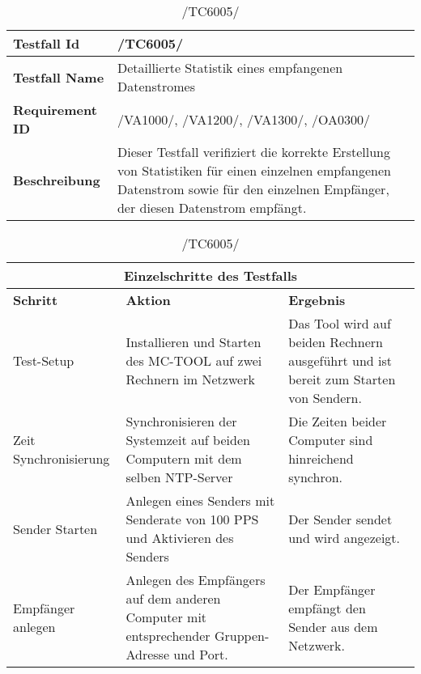     \begin{table}[h]
        \caption{/TC6005/}
        \label{tab:TC6005}
        \begin{center}
            \begin{tabular}{|p{3.5cm}|p{12cm}|}
                \hline
                    \textbf{Testfall Id} & /TC6005/\\
                \hline
                    \textbf{Testfall Name} & Detaillierte Statistik eines
                    empfangenen Datenstromes\\
                \hline
                    \textbf{Requirement ID} & /VA1000/, /VA1200/, /VA1300/,
                    /OA0300/\\
                \hline
                    \textbf{Beschreibung} & Dieser Testfall verifiziert die
                    korrekte Erstellung von Statistiken für einen einzelnen
                    empfangenen Datenstrom sowie für den einzelnen Empfänger,
                    der diesen Datenstrom empfängt.\\
                \hline
            \end{tabular}
            \begin{tabular}{|p{2.5cm}|p{5cm}|p{7.55cm}|}
                \multicolumn{3}{|c|}{\textbf{Einzelschritte des Testfalls}} \\
                \hline
                    \textbf{Schritt} & \textbf{Aktion} & \textbf{Ergebnis}\\
                \hline
                    Test-Setup & Installieren und Starten des MC-TOOL auf zwei
                    Rechnern im Netzwerk & Das Tool wird auf beiden Rechnern
                    ausgeführt und ist bereit zum Starten von Sendern. \\
                \hline
                    Zeit Synchronisierung & Synchronisieren der Systemzeit auf
                    beiden Computern mit dem selben NTP-Server & Die Zeiten
                    beider Computer sind hinreichend synchron.\\
                \hline
                    Sender Starten & Anlegen eines Senders mit Senderate von 100
                    PPS und Aktivieren des Senders & Der Sender sendet und wird
                    angezeigt.\\
                \hline
                    Empfänger anlegen & Anlegen des Empfängers auf dem
                    anderen Computer mit entsprechender Gruppen-Adresse und
                    Port. & Der Empfänger empfängt den Sender aus dem Netzwerk.\\

\end{tabular}
\end{center}
\end{table}
